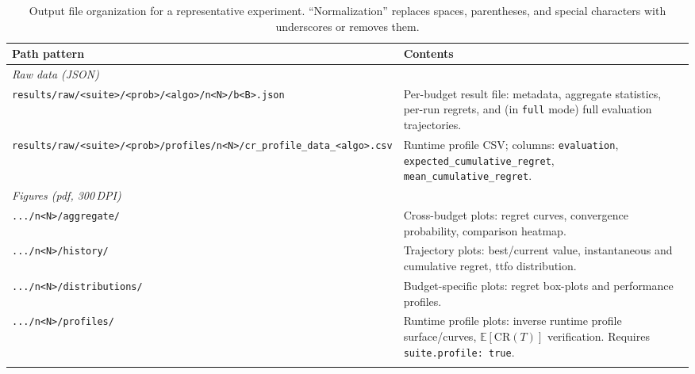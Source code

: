 \small
\begin{longtable}{p{0.55\linewidth}p{0.45\linewidth}}
  \hline
  \textbf{Path pattern} & \textbf{Contents} \\
  \hline
  \multicolumn{2}{l}{\textit{Raw data (JSON)}} \\
  \hline
  \small\texttt{results/raw/\newline<suite>/<prob>/<algo>/n<N>/b<B>.json}
  & Per-budget result file: metadata, aggregate statistics, per-run regrets,
  and (in \texttt{full} mode) full evaluation trajectories. \\[4pt]
  \small\texttt{results/raw/<suite>/<prob>/}\newline\texttt{profiles/n<N>/cr\_profile\_data\_<algo>.csv}
  & Runtime profile CSV; columns: \texttt{evaluation},
  \texttt{expected\_cumulative\_regret},
  \texttt{mean\_cumulative\_regret}. \\
  \hline
  \multicolumn{2}{l}{\textit{Figures (\acrshort{pdf}, 300\,DPI)}} \\
  \hline
  \texttt{.../n<N>/aggregate/}
  & Cross-budget plots: regret curves, convergence probability,
  comparison heatmap. \\[4pt]
  \texttt{.../n<N>/history/}
  & Trajectory plots: best/current value, instantaneous and cumulative
  regret, \acrfull{ttfo} distribution. \\[4pt]
  \texttt{.../n<N>/distributions/}
  & Budget-specific plots: regret box-plots and performance profiles. \\[4pt]
  \texttt{.../n<N>/profiles/}
  & Runtime profile plots: inverse runtime profile surface/curves,
  $\mathbb{E}[\mathrm{CR}(T)]$ verification.
  Requires \texttt{suite.profile: true}. \\
  \hline
  \caption[Experiment output organization]{Output file organization
    for a representative experiment.
    ``Normalization'' replaces spaces, parentheses, and special characters
  with underscores or removes them.}
  \label{tab:output-structure}
\end{longtable}

